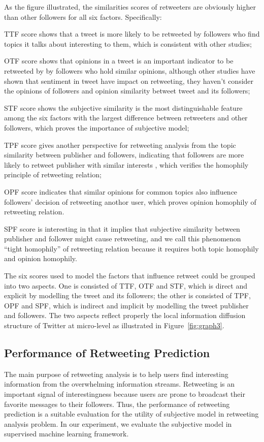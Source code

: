 \documentclass{acm_proc_article-sp}
\begin{document}
As the figure illustrated, the similarities scores of retweeters are obviously higher than other followers for all six factors. Specifically: 
\begin{itemize*}
\item TTF score shows that a tweet is more likely to be retweeted by followers who find topics it talks about interesting to them, which is consistent with other studies\cite{conf/icwsm/MacskassyM11, conf/wsdm/FengW13};
\item OTF score shows that opinions in a tweet is an important indicator to be retweeted by by followers who hold similar opinions, although other studies\cite{conf/icwsm/PfitznerGS12,2011:NaveedGKC} have shown that sentiment in tweet have impact on retweeting, they haven't consider the opinions of followers and opinion similarity betweet tweet and its followers;
\item STF score shows the subjective similarity is the most distinguishable feature among the six factors with the largest difference between retweeters and other followers, which proves the importance of subjective model;
\item TPF score gives another perspective for retweeting analysis from the topic similarity between publisher and followers, indicating that followers are more likely to retweet publisher with similar interests , which verifies the homophily principle of retweeting relation;
\item OPF score indicates that similar opinions for common topics also influence followers' decision of retweeting anothor user, which proves opinion homophily of retweeting relation.
\item SPF score is interesting in that it implies that subjective similarity between publisher and follower might cause retweeting, and we call this phenomenon ``tight homophily'' of retweeting relation because it requires both topic homophily and opinion homophily.
\end{itemize*} 
The six scores used to model the factors that influence retweet could be grouped into two aspects. 
One is consisted of TTF, OTF and STF, which is direct and explicit by modelling the tweet and its followers;
the other is consisted of TPF, OPF and SPF, which is indirect and implicit by modelling the tweet publisher and followers.
The two aspects reflect properly the local information diffusion structure of Twitter at micro-level as illustrated in Figure~\ref{fig:graph3}.

\subsection{Performance of Retweeting Prediction}
\label{performance}
The main purpose of retweeting analysis is to help users find interesting information from the overwhelming information streams. 
Retweeting is an important signal of interestingness because users are prone to broadcast their favorite messages to their followers. 
Thus, the performance of retweeting prediction is a suitable evaluation for the utility of subjective model in retweeting analysis problem.
In our experiment, we evaluate the subjective model in supervised machine learning framework.
\end{document}
